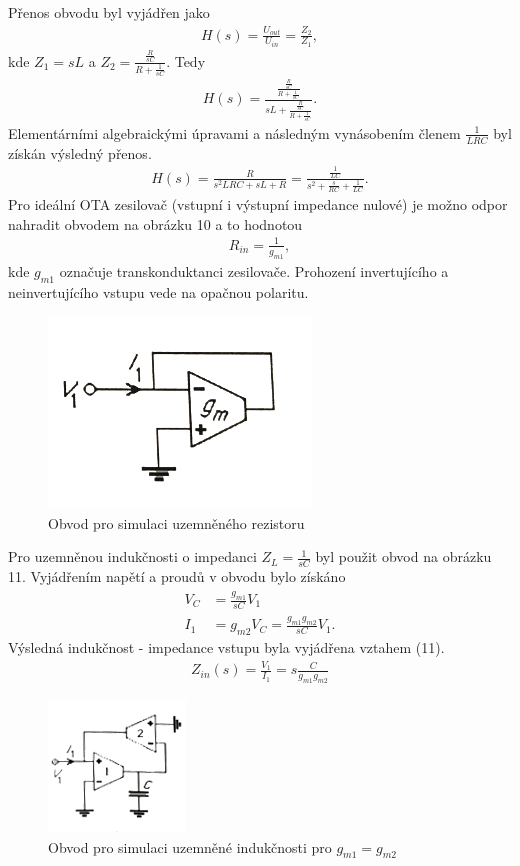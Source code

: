 \documentclass[twoside]{article}
\begin{document}
\noindent Přenos obvodu byl vyjádřen jako
\begin{align}
H(s) = \frac{U_{out}}{U_{in}} = \frac{Z_2}{Z_1},
\end{align}
kde $Z_1 = sL$ a $Z_2 = \frac{\frac{R}{sC}}{R + \frac{1}{sC}}$. Tedy
\begin{align}
H(s) = \frac{\frac{\frac{R}{sC}}{R + \frac{1}{sC}}}{sL + \frac{\frac{R}{sC}}{R + \frac{1}{sC}}}.
\end{align}
Elementárními algebraickými úpravami a následným vynásobením členem $\frac{1}{LRC}$ byl získán výsledný přenos.
\begin{align}
H(s) = \frac{R}{s^2LRC + sL + R} = \frac{\frac{1}{LC}}{s^2 + \frac{s}{RC} + \frac{1}{LC}}.
\end{align}
\noindent Pro ideální OTA zesilovač (vstupní i výstupní impedance nulové) je možno odpor nahradit obvodem na obrázku 10 a to hodnotou
\begin{align}
R_{in} = \frac{1}{g_{m1}},
\end{align}
kde $g_{m1}$ označuje transkonduktanci zesilovače. Prohození invertujícího a neinvertujícího vstupu vede na opačnou polaritu.
\begin{figure}[H]
\centering
\includegraphics[scale=0.7]{image10.png}
\caption{Obvod pro simulaci uzemněného rezistoru \cite{7}}
\end{figure}
\noindent Pro uzemněnou indukčnosti o impedanci $Z_L = \frac{1}{sC}$ byl použit obvod na obrázku 11. Vyjádřením napětí a proudů v obvodu bylo získáno 
\begin{align}
V_C &= \frac{g_{m1}}{sC}V_1 \\
I_1 &= g_{m2}V_C = \frac{g_{m1}g_{m2}}{sC}V_1.
\end{align}
Výsledná indukčnost - impedance vstupu byla vyjádřena vztahem (11).
\begin{align}
Z_{in}(s) = \frac{V_1}{I_1} = s\frac{C}{g_{m1}g_{m2}}
\end{align}
\begin{figure}[H]
\centering
\includegraphics[scale=1]{image12.png}
\caption{Obvod pro simulaci uzemněné indukčnosti pro $g_{m1} = g_{m2}$\cite{7}}
\end{figure}
\end{document}
